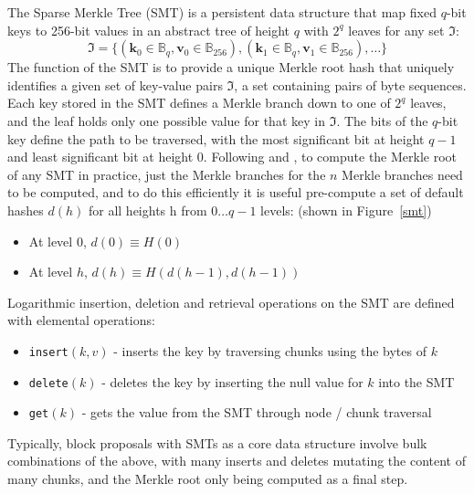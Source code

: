 \documentclass{article}
\newcommand{\defh}[1]{d(#1)}
\newcommand{\hash}[1]{H(#1)}
\begin{document}
The Sparse Merkle Tree (SMT) is a persistent data structure that map fixed $q$-bit keys to 256-bit values in an abstract tree of height $q$ with $2^{q}$ leaves for any set $\mathfrak{I}$:
\begin{equation}
\mathfrak{I} = \{ (\mathbf{k}_0 \in \mathbb{B}_{q}, \mathbf{v}_0 \in \mathbb{B}_{256}), (\mathbf{k}_1 \in \mathbb{B}_{q}, \mathbf{v}_1 \in \mathbb{B}_{256}), \ldots \}
\end{equation}
The function of the SMT is to provide a unique Merkle root hash that uniquely identifies a given set of key-value pairs $\mathfrak{I}$, a set containing pairs of byte sequences.  Each key stored in the SMT defines a Merkle branch down to one of $2^{q}$  leaves, and the leaf holds only one possible value for that key in $\mathfrak{I}$. The bits of the $q$-bit key define the path to be traversed, with the most significant bit at height $q-1$ and least significant bit at height $0$.  Following \cite{lauriekasper2012} and \cite{Dahlberg2016EfficientSM}, to compute the Merkle root of any SMT in practice, just the Merkle branches for the $n$ Merkle branches need to be computed, and to do this efficiently it is useful pre-compute a set of default hashes $\defh{h}$ for all heights h from $0 \ldots q-1$ levels: (shown in Figure~\ref{smt})
\begin{itemize}
\item At level 0, $\defh{0} \equiv \hash{0}$
\item At level $h$, $\defh{h} \equiv \hash{ \defh{h-1}, \defh{h-1} }$
\end{itemize}
Logarithmic insertion, deletion and retrieval operations on the SMT are defined with elemental operations:
\begin{itemize}
    \item \texttt{insert}$(k,v)$ - inserts the key by traversing chunks using the bytes of $k$
    \item \texttt{delete}$(k)$ - deletes the key by inserting the null value for $k$ into the SMT
    \item \texttt{get}$(k)$ - gets the value from the SMT through node / chunk traversal
\end{itemize}
Typically, block proposals with SMTs as a core data structure involve bulk combinations of the above, with many inserts and deletes mutating the content of many chunks, and the Merkle root only being computed as a final step.
\end{document}

